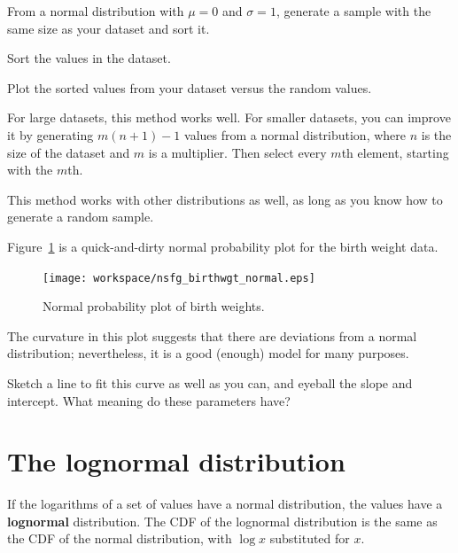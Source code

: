 \documentclass[12pt]{book}
\begin{document}
\begin{description}

\item From a normal distribution with $\mu = 0$ and $\sigma = 1$,
generate a sample with the same size as your dataset and sort it.

\item Sort the values in the dataset.

\item Plot the sorted values from your dataset versus the random values.

\end{description}

For large datasets, this method works well.
For smaller datasets, you can improve it by generating $m (n+1) - 1$
values from a normal distribution, where $n$ is the size of the
dataset and $m$ is a multiplier.  Then select every $m$th element,
starting with the $m$th.  


This method works with other distributions as well, as long as
you know how to generate a random sample.

Figure~\ref{nsfg_birthwgt_normal} is a quick-and-dirty normal
probability plot for the birth weight data.

\begin{figure}
\centerline{\texttt{[image: workspace/nsfg\_birthwgt\_normal.eps]}}
\caption{Normal probability plot of birth weights.}
\label{nsfg_birthwgt_normal}
\end{figure}

The curvature in this plot suggests that there are
deviations from a normal distribution; nevertheless, it is a
good (enough) model for many purposes.

\begin{ex}

Sketch a line to fit this curve as well as you can, and
eyeball the slope and intercept.  What meaning do these parameters have?

\end{ex}


\section{The lognormal distribution}
\label{lognormal}

If the logarithms of a set of values have a normal distribution, the
values have a {\bf lognormal} distribution.  The CDF of the lognormal
distribution is the same as the CDF of the normal distribution,
with $\log x$ substituted for $x$.
\end{document}

